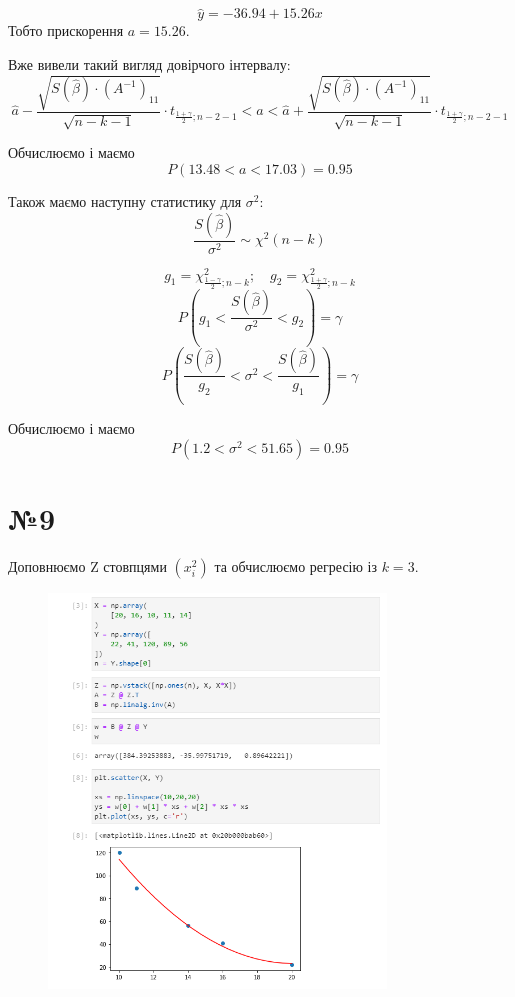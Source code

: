 \documentclass[11pt, a4paper]{article} %
\begin{document}
$$\hat y = -36.94 + 15.26 x$$
Тобто прискорення $a = 15.26$.

Вже вивели такий вигляд довірчого інтервалу:
$$\hat a - \frac{\sqrt{S(\hat \beta) \cdot \left(A^{-1}\right)_{11}}}{\sqrt{n-k-1}} \cdot t_{\frac{1+\gamma}{2};n-2-1} < a < \hat a + \frac{\sqrt{S(\hat \beta) \cdot \left(A^{-1}\right)_{11}}}{\sqrt{n-k-1}} \cdot t_{\frac{1+\gamma}{2};n-2-1}$$

Обчислюємо і маємо
$$P(13.48 < a < 17.03) = 0.95$$

Також маємо наступну статистику для $\sigma^2$:
$$\frac{S(\hat \beta)}{\sigma^2} \sim \chi^2(n-k)$$

$$g_1 = \chi^2_{\frac{1-\gamma}{2};n-k}; \quad g_2 = \chi^2_{\frac{1+\gamma}{2};n-k}$$
$$P\left(g_1 < \frac{S(\hat \beta)}{\sigma^2} < g_2\right) = \gamma$$
$$P\left(\frac{S(\hat \beta)}{g_2} < \sigma^2 < \frac{S(\hat \beta)}{g_1}\right) = \gamma$$

Обчислюємо і маємо
$$P(1.2 < \sigma^2 < 51.65) = 0.95$$


\pagebreak

\section*{№9}
Доповнюємо Z стовпцями $(x_i^2)$ та обчислюємо регресію із $k=3$.

\begin{figure}[h]
    \centering
    \includegraphics[width=0.8\textwidth]{task9.png}
\end{figure}
\end{document}
